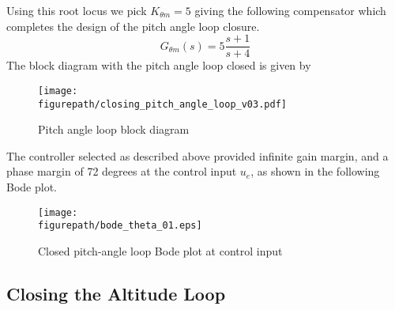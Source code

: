 \documentclass[]{../sty/aiaa-tc}
\newcommand{\figurepath}{../fig}
\theoremstyle{examplestyle}
\begin{document}
  Using this root locus we pick $K_{\theta m} = 5$ giving the following compensator which completes the design of the pitch angle loop closure.
  \begin{equation*}
    G_{\theta m}(s) = 5 \frac{s+1}{s+4}
  \end{equation*}
  The block diagram with the pitch angle loop closed is given by
  \begin{figure}[H]
    \begin{center}
      \texttt{[image: \\figurepath/closing\_pitch\_angle\_loop\_v03.pdf]}
      \vspace{-0.1in}
      \caption{Pitch angle loop block diagram}
    \end{center}
  \end{figure}
  The controller selected as described above provided infinite gain margin, and a phase margin of 72 degrees at the control input $u_{e}$, as shown in the following Bode plot.
  \begin{figure}[H]
    \begin{center}
      \texttt{[image: \\figurepath/bode\_theta\_01.eps]}
      \vspace{-0.1in}
      \caption{Closed pitch-angle loop Bode plot at control input}
    \end{center}
  \end{figure}

  \subsection{Closing the Altitude Loop}
\end{document}
